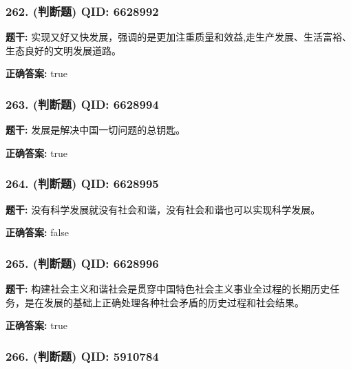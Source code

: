 \documentclass[12pt,UTF8]{ctexart}
\begin{document}
\subsubsection*{262. (判断题) \small QID: 6628992}

\textbf{题干:}
实现又好又快发展，强调的是更加注重质量和效益,走生产发展、生活富裕、生态良好的文明发展道路。

\textbf{正确答案:}
true

\vspace{0.3em}\hrulefill\vspace{0.7em}

\subsubsection*{263. (判断题) \small QID: 6628994}

\textbf{题干:}
发展是解决中国一切问题的总钥匙。

\textbf{正确答案:}
true

\vspace{0.3em}\hrulefill\vspace{0.7em}

\subsubsection*{264. (判断题) \small QID: 6628995}

\textbf{题干:}
没有科学发展就没有社会和谐，没有社会和谐也可以实现科学发展。

\textbf{正确答案:}
false

\vspace{0.3em}\hrulefill\vspace{0.7em}

\subsubsection*{265. (判断题) \small QID: 6628996}

\textbf{题干:}
构建社会主义和谐社会是贯穿中国特色社会主义事业全过程的长期历史任务，是在发展的基础上正确处理各种社会矛盾的历史过程和社会结果。

\textbf{正确答案:}
true

\vspace{0.3em}\hrulefill\vspace{0.7em}

\subsubsection*{266. (判断题) \small QID: 5910784}
\end{document}

